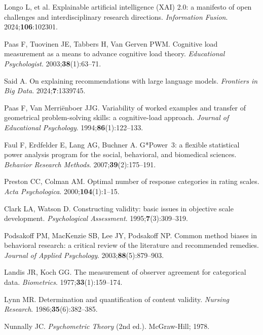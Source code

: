\documentclass[ASNA,twocolumn]{USG} %
\begin{document}
\begin{thebibliography}{}
Longo L, et al.
Explainable artificial intelligence (XAI) 2.0: a manifesto of open
challenges and interdisciplinary research directions.
\textit{Information Fusion}.
2024;\textbf{106}:102301.

Paas F, Tuovinen JE, Tabbers H, Van Gerven PWM.
Cognitive load measurement as a means to advance cognitive load theory.
\textit{Educational Psychologist}.
2003;\textbf{38}(1):63--71.

Said A.
On explaining recommendations with large language models.
\textit{Frontiers in Big Data}.
2024;\textbf{7}:1339745.

Paas F, Van Merri\"{e}nboer JJG.
Variability of worked examples and transfer of geometrical
problem-solving skills: a cognitive-load approach.
\textit{Journal of Educational Psychology}.
1994;\textbf{86}(1):122--133.

Faul F, Erdfelder E, Lang AG, Buchner A.
G*Power~3: a flexible statistical power analysis program for the
social, behavioral, and biomedical sciences.
\textit{Behavior Research Methods}.
2007;\textbf{39}(2):175--191.

Preston CC, Colman AM.
Optimal number of response categories in rating scales.
\textit{Acta Psychologica}.
2000;\textbf{104}(1):1--15.

Clark LA, Watson D.
Constructing validity: basic issues in objective scale development.
\textit{Psychological Assessment}.
1995;\textbf{7}(3):309--319.

Podsakoff PM, MacKenzie SB, Lee JY, Podsakoff NP.
Common method biases in behavioral research: a critical review of
the literature and recommended remedies.
\textit{Journal of Applied Psychology}.
2003;\textbf{88}(5):879--903.

Landis JR, Koch GG.
The measurement of observer agreement for categorical data.
\textit{Biometrics}.
1977;\textbf{33}(1):159--174.

Lynn MR.
Determination and quantification of content validity.
\textit{Nursing Research}.
1986;\textbf{35}(6):382--385.

Nunnally JC.
\textit{Psychometric Theory} (2nd ed.).
McGraw-Hill; 1978.

\end{thebibliography}
\end{document}
